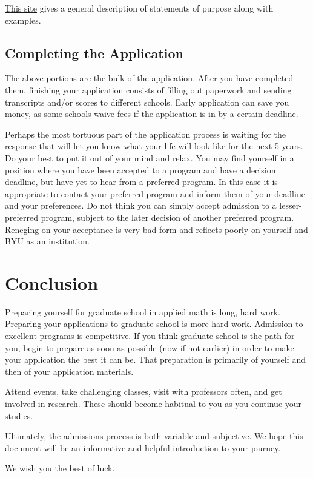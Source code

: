 \documentclass[11pt]{article}
\begin{document}
\href{https://www.collegeessayguy.com/blog/statement-of-purpose-examples}{This site} gives a general description of statements of purpose along with examples.

\subsection{Completing the Application}
The above portions are the bulk of the application. After you have completed them, finishing your application consists of filling out paperwork and sending transcripts and/or scores to different schools. Early application can save you money, as some schools waive fees if the application is in by a certain deadline.

Perhaps the most tortuous part of the application process is waiting for the response that will let you know what your life will look like for the next 5 years. Do your best to put it out of your mind and relax. You may find yourself in a position where you have been accepted to a program and have a decision deadline, but have yet to hear from a preferred program. In this case it is appropriate to contact your preferred program and inform them of your deadline and your preferences. Do not think you can simply accept admission to a lesser-preferred program, subject to the later decision of another preferred program. Reneging on your acceptance is very bad form and reflects poorly on yourself and BYU as an institution.

\newpage

\section*{Conclusion}
Preparing yourself for graduate school in applied math is long, hard work. Preparing your applications to graduate school is more hard work. Admission to excellent programs is competitive. If you think graduate school is the path for you, begin to prepare as soon as possible (now if not earlier) in order to make your application the best it can be. That preparation is primarily of yourself and then of your application materials.

Attend events, take challenging classes, visit with professors often, and get involved in research. These should become habitual to you as you continue your studies. 

Ultimately, the admissions process is both variable and subjective. We hope this document will be an informative and helpful introduction to your journey. 

We wish you the best of luck.
\end{document}
